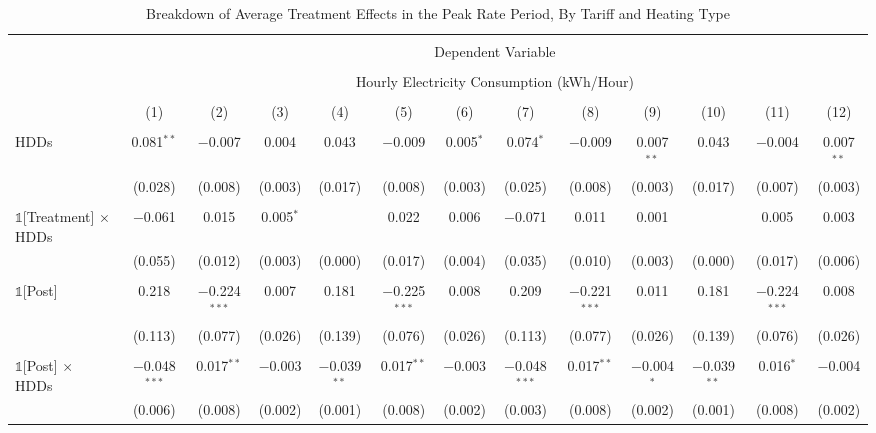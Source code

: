 
\begin{table}[!htbp] \centering 
  \caption{Breakdown of Average Treatment Effects in the Peak Rate Period, By Tariff and Heating Type} 
  \label{Table:Breakdown-of-Average-Treatment-Effects-in-the-Peak-Rate-Period_By-Tariff-and-Heating-Type} 
\small 
\begin{tabular}{@{\extracolsep{20pt}}lcccccccccccc} 
\\[-1.8ex]\hline 
\hline \\[-1.8ex] 
 & \multicolumn{12}{c}{Dependent Variable} \\ 
\cline{2-13} 
\\[-1.8ex] & \multicolumn{12}{c}{Hourly Electricity Consumption  (kWh/Hour)} \\ 
\\[-1.8ex] & (1) & (2) & (3) & (4) & (5) & (6) & (7) & (8) & (9) & (10) & (11) & (12)\\ 
\hline \\[-1.8ex] 
 HDDs & 0.081$^{**}$ & $-$0.007 & 0.004 & 0.043 & $-$0.009 & 0.005$^{*}$ & 0.074$^{*}$ & $-$0.009 & 0.007$^{**}$ & 0.043 & $-$0.004 & 0.007$^{**}$ \\ 
  & (0.028) & (0.008) & (0.003) & (0.017) & (0.008) & (0.003) & (0.025) & (0.008) & (0.003) & (0.017) & (0.007) & (0.003) \\ 
  & & & & & & & & & & & & \\ 
 $\mathbb{1}$[Treatment] $\times$ HDDs & $-$0.061 & 0.015 & 0.005$^{*}$ &  & 0.022 & 0.006 & $-$0.071 & 0.011 & 0.001 &  & 0.005 & 0.003 \\ 
  & (0.055) & (0.012) & (0.003) & (0.000) & (0.017) & (0.004) & (0.035) & (0.010) & (0.003) & (0.000) & (0.017) & (0.006) \\ 
  & & & & & & & & & & & & \\ 
 $\mathbb{1}$[Post] & 0.218 & $-$0.224$^{***}$ & 0.007 & 0.181 & $-$0.225$^{***}$ & 0.008 & 0.209 & $-$0.221$^{***}$ & 0.011 & 0.181 & $-$0.224$^{***}$ & 0.008 \\ 
  & (0.113) & (0.077) & (0.026) & (0.139) & (0.076) & (0.026) & (0.113) & (0.077) & (0.026) & (0.139) & (0.076) & (0.026) \\ 
  & & & & & & & & & & & & \\ 
 $\mathbb{1}$[Post] $\times$ HDDs & $-$0.048$^{***}$ & 0.017$^{**}$ & $-$0.003 & $-$0.039$^{**}$ & 0.017$^{**}$ & $-$0.003 & $-$0.048$^{***}$ & 0.017$^{**}$ & $-$0.004$^{*}$ & $-$0.039$^{**}$ & 0.016$^{*}$ & $-$0.004 \\ 
  & (0.006) & (0.008) & (0.002) & (0.001) & (0.008) & (0.002) & (0.003) & (0.008) & (0.002) & (0.001) & (0.008) & (0.002) \\ 

\end{tabular}
\end{table}
